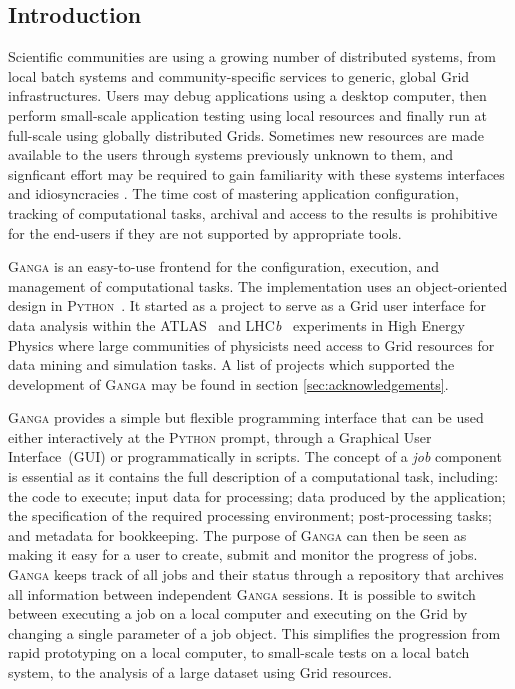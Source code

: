 \documentclass{elsart}
\def\lhcb {LHC{\em b\/}\xspace}
\def\atlas {ATLAS\xspace}
\def\ganga {\textsc{Ganga}\xspace}
\def\python {\textsc{Python}\xspace}
\def\grid {Grid\xspace}
\newcommand{\qq}[1]{#1}
\begin{document}
\begin{linenumbers}

\section{Introduction}
\label{sec:intro}

\qq{
Scientific communities are using a growing number of distributed
systems, from local batch systems and community-specific services to
generic, global Grid infrastructures.  Users may debug applications
using a desktop computer, then perform small-scale application testing
using local resources and finally run at full-scale using globally
distributed Grids. Sometimes new resources are made available to the
users through systems previously unknown to them, and signficant
effort may be required to gain familiarity with these systems
interfaces and idiosyncracies . The time cost of mastering application configuration,
tracking of computational tasks, archival and access to the results is
prohibitive for the end-users if they are not supported by appropriate
tools.  }


\ganga is an easy-to-use frontend for the configuration, execution, and
management of computational tasks. The implementation uses an object-oriented
design in \python~\cite{python}. It started as a project
to serve as a \grid user interface for data
analysis within the \atlas~\cite{ATLAS} and
\lhcb~\cite{LHCb} experiments in High Energy Physics where large
communities of physicists need access to \grid resources for data
mining and simulation tasks. A list of projects which supported the
development of \ganga may be found in
section \ref{sec:acknowledgements}. 


\ganga provides a simple but flexible programming interface that can
be used either interactively at the \python prompt, through a
Graphical User Interface~(GUI) or programmatically in scripts. The
concept of a \emph{job} component is essential as it contains the full
description of a computational task, including: the code to execute;
input data for processing; data produced by the application; the
specification of the required processing environment; post-processing
tasks; and metadata for bookkeeping.  The purpose of \ganga can then
be seen as making it easy for a user to create, submit and monitor the
progress of jobs. \ganga keeps track of all jobs and their status
through a repository that archives all information between independent
\ganga sessions. It is possible to switch between executing a job on a
local computer and executing on the \grid by changing a single parameter of a job object. 
This simplifies the progression from rapid prototyping on a local
computer, to small-scale tests on a local batch system, to the analysis of a
large dataset using \grid resources.


\end{linenumbers}
\end{document}
